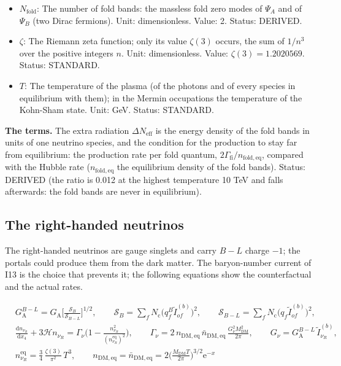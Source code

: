 \documentclass[
  10pt,
]{article}
\begin{document}
\begin{itemize}
  \(\mathcal{H} = \dot a_4\) (the Hubble rate of the observer; in the
  hot Universe
  \(\mathcal{H} = (8\pi^3g_\rho/90)^{1/2}T^2/M_{\mathrm{Pl}}\)). Unit:
  GeV. Status: DERIVED.
\item
  \(N_{\mathrm{fold}}\): The number of fold bands: the massless fold
  zero modes of \(\Psi_A\) and of \(\Psi_B\) (two Dirac fermions). Unit:
  dimensionless. Value: 2. Status: DERIVED.
\item
  \(\zeta\): The Riemann zeta function; only its value \(\zeta(3)\)
  occurs, the sum of \(1/n^3\) over the positive integers \(n\). Unit:
  dimensionless. Value: \(\zeta(3) = 1.2020569\). Status: STANDARD.
\item
  \(T\): The temperature of the plasma (of the photons and of every
  species in equilibrium with them); in the Mermin occupations the
  temperature of the Kohn-Sham state. Unit: GeV. Status: STANDARD.
\end{itemize}

\textbf{The terms.} The extra radiation \(\Delta N_{\mathrm{eff}}\) is
the energy density of the fold bands in units of one neutrino species,
and the condition for the production to stay far from equilibrium: the
production rate per fold quantum,
\(2\Gamma_{\mathrm{fi}}/n_{\mathrm{fold,eq}}\), compared with the Hubble
rate (\(n_{\mathrm{fold,eq}}\) the equilibrium density of the fold
bands). Status: DERIVED (the ratio is 0.012 at the highest temperature
10 TeV and falls afterwards: the fold bands are never in equilibrium).

\hypertarget{the-right-handed-neutrinos}{%
\subsection{The right-handed
neutrinos}\label{the-right-handed-neutrinos}}

The right-handed neutrinos are gauge singlets and carry \(B - L\) charge
\(-1\); the portals could produce them from the dark matter. The
baryon-number current of I13 is the choice that prevents it; the
following equations show the counterfactual and the actual rates.

\[
\begin{aligned}
&G_{\mathrm{A}}^{B-L} = G_{\mathrm{A}}\Big[\frac{\mathcal{S}_B}{\mathcal{S}_{B-L}}\Big]^{1/2},\qquad
 \mathcal{S}_B = \sum_fN_{\mathrm{c}}\big(q^{B}_f\tilde I^{(b)}_{of}\big)^2,\qquad
 \mathcal{S}_{B-L} = \sum_fN_{\mathrm{c}}\big(q_f\tilde I^{(b)}_{of}\big)^2,\\
&\frac{\mathrm{d}n_{\nu_R}}{\mathrm{d}x_4} + 3\mathcal{H}n_{\nu_R} = \Gamma_\nu\Big(1 -
 \frac{n_{\nu_R}^2}{(n_{\nu_R}^{\mathrm{eq}})^2}\Big),\qquad
 \Gamma_\nu = 2\,n_{\mathrm{DM,eq}}\,\bar n_{\mathrm{DM,eq}}\,\frac{G_\nu^2M_{\mathrm{DM}}^2}{2\pi},\qquad
 G_\nu = G_{\mathrm{A}}^{B-L}\,\tilde I^{(b)}_{\nu_R},\\
&n_{\nu_R}^{\mathrm{eq}} = \frac34\,\frac{\zeta(3)}{\pi^2}\,T^3,\qquad
 n_{\mathrm{DM,eq}} = \bar n_{\mathrm{DM,eq}} = 2\Big(\frac{M_{\mathrm{DM}}T}{2\pi}\Big)^{3/2}\mathrm{e}^{-x}
\end{aligned} \tag{FE-131}
\]
\end{document}
